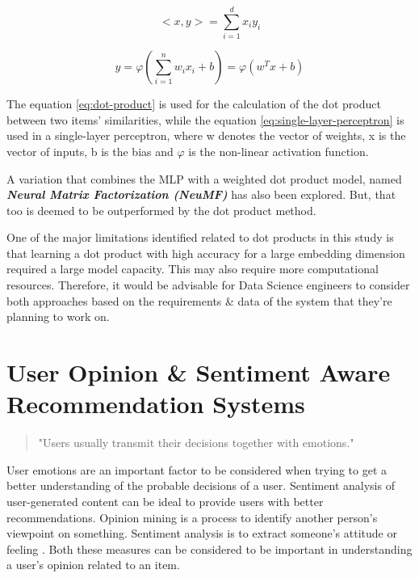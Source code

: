 \documentclass[manuscript,screen,natbib=false]{acmart}
\begin{document}
\begin{equation}
<x,y>  = \sum_{i=1}^{d}x_{i}y_{i}\label{eq:dot-product}
\end{equation}

\begin{equation}
y = \varphi(\sum_{i=1}^{n}w_{i}x_{i}+b) = \varphi(w^{T}x+b)\label{eq:single-layer-perceptron}
\end{equation}

The equation \ref{eq:dot-product} is used for the calculation of the dot product between two items' similarities, while the equation \ref{eq:single-layer-perceptron} is used in a single-layer perceptron, where w denotes the vector of weights, x is the vector of inputs, b is the bias and $\varphi$ is the non-linear activation function.

A variation that combines the MLP with a weighted dot product model, named \textbf{\emph{Neural Matrix Factorization (NeuMF)}} has also been explored. But, that too is deemed to be outperformed by the dot product method.

One of the major limitations identified related to dot products in this study is that learning a dot product with high accuracy for a large embedding dimension required a large model capacity. This may also require more computational resources. Therefore, it would be advisable for Data Science engineers to consider both approaches based on the requirements \& data of the system that they're planning to work on.



\section{User Opinion \& Sentiment Aware Recommendation Systems}

\begin{quote} 
\centering 
"Users usually transmit their decisions together with emotions."\cite{chen_user_2019}
\end{quote}

User emotions are an important factor to be considered when trying to get a better understanding of the probable decisions of a user. Sentiment analysis of user-generated content can be ideal to provide users with better recommendations. Opinion mining is a process to identify another person's viewpoint on something. Sentiment analysis is to extract someone's attitude or feeling \cite{nah_opinion_2018}. Both these measures can be considered to be important in understanding a user's opinion related to an item.
\end{document}
